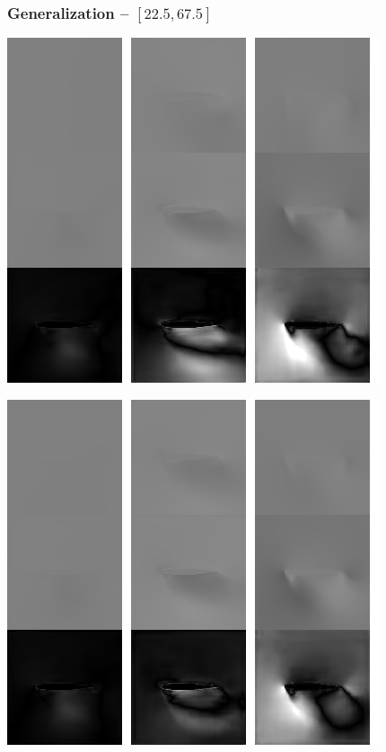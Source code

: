 \begin{frame}
    \frametitle{Generalization -- $[22.5, 67.5]$}
    \vspace*{.1cm}
\begin{multicols}{2}
	
	\includegraphics[width=.9\columnwidth, height=.6\textheight]{./Ressourcen/Praesentation/Bilder/TransferEval/right/0088_bw.png}%
    \vfill\columnbreak
    
    \includegraphics[width=.9\columnwidth, height=.6\textheight]{./Ressourcen/Praesentation/Bilder/TransferEval/right/0089_bw.png}%
\end{multicols}
    
\end{frame}
\clearpage

